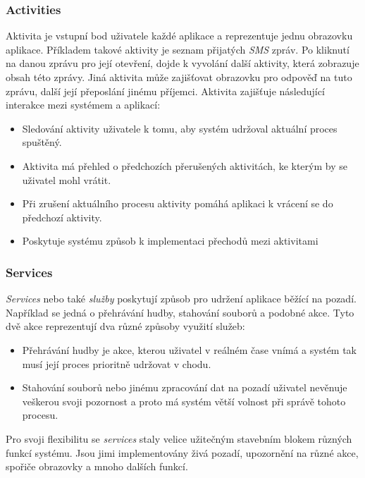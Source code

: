         \subsubsection{Activities}
        Aktivita je vstupní bod uživatele každé aplikace a reprezentuje jednu obrazovku aplikace. Příkladem takové aktivity je seznam přijatých \emph{SMS} zpráv. Po kliknutí na danou zprávu pro její otevření, dojde k vyvolání další aktivity, která zobrazuje obsah této zprávy. Jiná aktivita může zajišťovat obrazovku pro odpověď na tuto zprávu, další její přeposlání jinému příjemci. Aktivita zajišťuje následující interakce mezi systémem a aplikací:
        \begin{itemize}
            \item Sledování aktivity uživatele k tomu, aby systém udržoval aktuální proces spuštěný.
            \item Aktivita má přehled o předchozích přerušených aktivitách, ke kterým by se uživatel mohl vrátit.
            \item Při zrušení aktuálního procesu aktivity pomáhá aplikaci k vrácení se do předchozí aktivity.
            \item Poskytuje systému způsob k implementaci přechodů mezi aktivitami
        \end{itemize}

        \subsubsection{Services}
        \emph{Services} nebo také \emph{služby} poskytují způsob pro udržení aplikace běžící na pozadí. Například se jedná o přehrávání hudby, stahování souborů a podobné akce. Tyto dvě akce reprezentují dva různé způsoby využití služeb:
        \begin{itemize}
            \item Přehrávání hudby je akce, kterou uživatel v reálném čase vnímá a systém tak musí její proces prioritně udržovat v chodu.
            \item Stahování souborů nebo jinému zpracování dat na pozadí uživatel nevěnuje veškerou svoji pozornost a proto má systém větší volnost při správě tohoto procesu.
        \end{itemize}
        Pro svoji flexibilitu se \emph{services} staly velice užitečným stavebním blokem různých funkcí systému. Jsou jimi implementovány živá pozadí, upozornění na různé akce, spořiče obrazovky a mnoho dalších funkcí.
        
